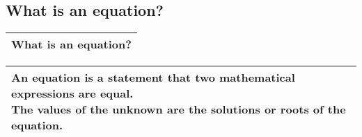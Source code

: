 \subsection{What is an equation?}
\begin{small}
    \begin{tabularx}{1\textwidth}{
            p{}
        }
        \toprule
        What is an equation?
        \\
        \bottomrule
    \end{tabularx}
\end{small}
\begin{small}
    \begin{tabularx}{1\textwidth}{
            p{}
        }
        \toprule
        \makecell{
            An equation is a statement that two mathematical expressions are equal. \\
            The values of the unknown are the \textbf{solutions} or
            \textbf{roots} of the equation.
        }
        \\
        \bottomrule

    \end{tabularx}
\end{small}

